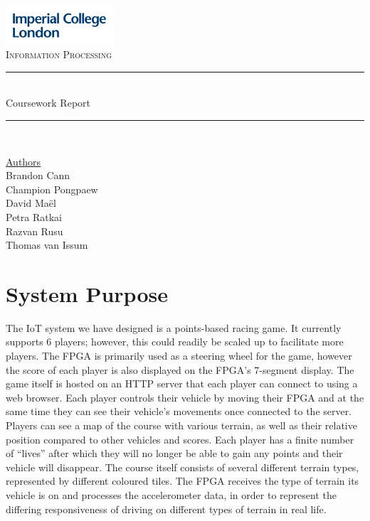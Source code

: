 \documentclass[12pt,a4paper]{article}
\begin{document}
\begin{titlepage}
	\newcommand{\HRule}{\rule{\linewidth}{0.5mm}}
    \includegraphics[width = 4cm]{./Images/Logo.jpg}\\[0.5cm] 
    
    \center 
	\textsc{\large Information Processing }\\[0.3cm] 
    
	\HRule \\[0.3cm]
	Coursework Report
    \HRule \\[0.7cm]
     
    \begin{center}
		\underline{Authors}\\[0.1cm] Brandon Cann\\[0.1cm]
        Champion Pongpaew\\[0.1cm]
        David Maël\\[0.1cm]
        Petra Ratkai\\[0.1cm]
		Razvan Rusu\\[0.1cm]
		Thomas van Issum\\[0.7cm]
	\end{center} \large

    \tableofcontents

    \vfill %
\end{titlepage}

\section{\normalsize System Purpose}

{\small The IoT system we have designed is a points-based racing game. 
It currently supports 6 players; however, this could readily be 
scaled up to facilitate more players. The FPGA is primarily used 
as a steering wheel for the game, however the score of each player 
is also displayed on the FPGA’s 7-segment display. The game itself 
is hosted on an HTTP server that each player can connect to using a 
web browser. Each player controls their vehicle by moving their FPGA 
and at the same time they can see their vehicle’s movements once 
connected to the server. Players can see a map of the course with 
various terrain, as well as their relative position compared to 
other vehicles and scores. Each player has a finite number of “lives” 
after which they will no longer be able to gain any points and their 
vehicle will disappear. The course itself consists of several different 
terrain types, represented by different coloured tiles. The FPGA 
receives the type of terrain its vehicle is on and processes the 
accelerometer data, in order to represent the differing responsiveness 
of driving on different types of terrain in real life. }
\end{document}
